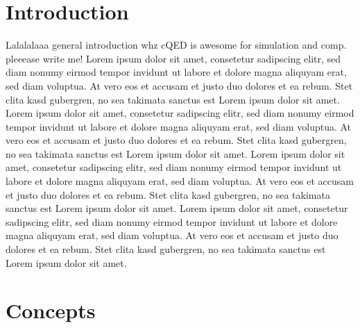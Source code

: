
\section{Introduction}
\label{sec:introcution}



Lalalalaaa general introduction whz cQED is awesome for simulation and comp. pleeease write me! Lorem ipsum dolor sit amet, consetetur sadipscing elitr, sed diam nonumy eirmod tempor invidunt ut labore et dolore magna aliquyam erat, sed diam voluptua. At vero eos et accusam et justo duo dolores et ea rebum. Stet clita kasd gubergren, no sea takimata sanctus est Lorem ipsum dolor sit amet. Lorem ipsum dolor sit amet, consetetur sadipscing elitr, sed diam nonumy eirmod tempor invidunt ut labore et dolore magna aliquyam erat, sed diam voluptua. At vero eos et accusam et justo duo dolores et ea rebum. Stet clita kasd gubergren, no sea takimata sanctus est Lorem ipsum dolor sit amet. Lorem ipsum dolor sit amet, consetetur sadipscing elitr, sed diam nonumy eirmod tempor invidunt ut labore et dolore magna aliquyam erat, sed diam voluptua. At vero eos et accusam et justo duo dolores et ea rebum. Stet clita kasd gubergren, no sea takimata sanctus est Lorem ipsum dolor sit amet. Lorem ipsum dolor sit amet, consetetur sadipscing elitr, sed diam nonumy eirmod tempor invidunt ut labore et dolore magna aliquyam erat, sed diam voluptua. At vero eos et accusam et justo duo dolores et ea rebum. Stet clita kasd gubergren, no sea takimata sanctus est Lorem ipsum dolor sit amet. 




\section{Concepts}
\label{sec:concepts}

